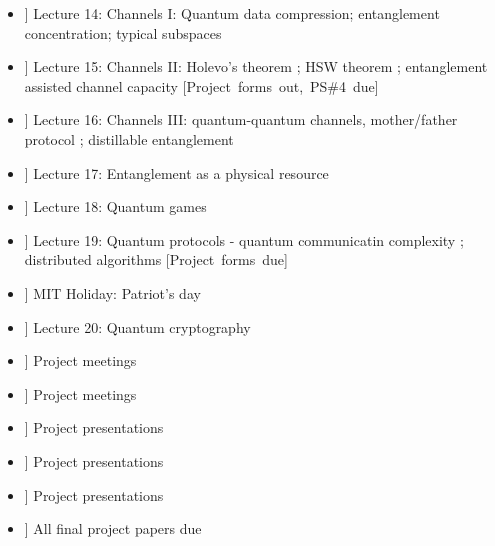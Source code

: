 \documentclass[preprint,pra,12pt]{ikedoc3}
\begin{document}
\begin{itemize}
\item[\bf [T 01-Apr]] Lecture 14: Channels I: Quantum data
compression; entanglement concentration; typical subspaces 

\item[\bf [R 03-Apr]] Lecture 15: Channels II: Holevo's theorem ; HSW
theorem ; entanglement assisted channel capacity 
\hfill \mbox{[Project forms out, PS\#4 due]}

\item[\bf [T 08-Apr]] Lecture 16: Channels III: quantum-quantum
channels, mother/father protocol ; distillable entanglement 

\item[\bf [R 10-Apr]] Lecture 17: Entanglement as a physical resource 

\item[\bf [T 15-Apr]] Lecture 18: Quantum games 

\item[\bf [R 17-Apr]] Lecture 19: Quantum protocols - quantum
communicatin complexity ; distributed algorithms  
\hfill\mbox{[Project forms due]}

\item[\bf [T 22-Apr]] MIT Holiday: Patriot's day 

\item[\bf [R 24-Apr]] Lecture 20: Quantum cryptography 

\item[\bf [T 29-Apr]] Project meetings 

\item[\bf [R 01-May]] Project meetings 

\item[\bf [T 06-May]] Project presentations 

\item[\bf [R 08-May]] Project presentations 

\item[\bf [T 13-May]] Project presentations 

\item[\bf [R 15-May]] All final project papers due

\end{itemize}
\end{document}
